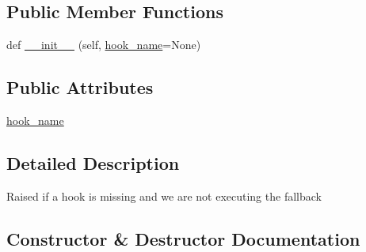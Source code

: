 \subsection*{Public Member Functions}
\begin{DoxyCompactItemize}
\item 
def \hyperlink{classpip_1_1__vendor_1_1pep517_1_1in__process_1_1__in__process_1_1HookMissing_add1e3646cf07496c38ded8efc1f0fd76}{\+\_\+\+\_\+init\+\_\+\+\_\+} (self, \hyperlink{classpip_1_1__vendor_1_1pep517_1_1in__process_1_1__in__process_1_1HookMissing_a2c9b755d0d59681621d7233832050cde}{hook\+\_\+name}=None)
\end{DoxyCompactItemize}
\subsection*{Public Attributes}
\begin{DoxyCompactItemize}
\item 
\hyperlink{classpip_1_1__vendor_1_1pep517_1_1in__process_1_1__in__process_1_1HookMissing_a2c9b755d0d59681621d7233832050cde}{hook\+\_\+name}
\end{DoxyCompactItemize}


\subsection{Detailed Description}
\begin{DoxyVerb}Raised if a hook is missing and we are not executing the fallback\end{DoxyVerb}
 

\subsection{Constructor \& Destructor Documentation}
\mbox{\label{classpip_1_1__vendor_1_1pep517_1_1in__process_1_1__in__process_1_1HookMissing_add1e3646cf07496c38ded8efc1f0fd76}} 
